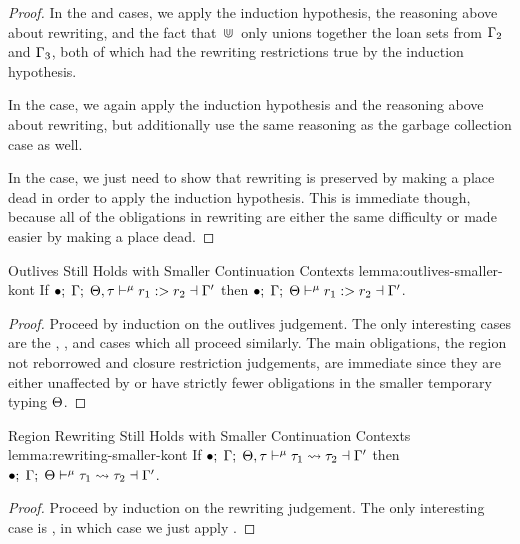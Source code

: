 \begin{proof}
  In the  and  cases, we apply the induction
  hypothesis, the reasoning above about rewriting, and the fact that
  $\, \Cup \,$ only unions together the loan sets from $\Gamma_2$ and
  $\Gamma_3$, both of which had the rewriting restrictions true by the
  induction hypothesis.

  In the  case, we again apply the induction hypothesis and the
  reasoning above about rewriting, but additionally use the same reasoning as
  the garbage collection case as well.

  In the  case, we just need to show that rewriting is preserved
  by making a place dead in order to apply the induction hypothesis. This is
  immediate though, because all of the obligations in rewriting are either the
  same difficulty or made easier by making a place dead.
\end{proof}

\begin{oxlemma}{Outlives Still Holds with Smaller Continuation Contexts}
  {lemma:outlives-smaller-kont}
  If $\bullet; \; \Gamma; \; \Theta, \tau \vdash^{\mu} r_1 :> r_2 \dashv \Gamma^\prime$
  then $\bullet; \; \Gamma; \; \Theta \vdash^{\mu} r_1 :> r_2 \dashv \Gamma^\prime$.
\end{oxlemma}
\begin{proof}
  Proceed by induction on the outlives judgement. The only interesting cases are
  the , , and
   cases which all proceed similarly. The main
  obligations, the region not reborrowed and closure restriction judgements, are
  immediate since they are either unaffected by or have strictly fewer
  obligations in the smaller temporary typing $\Theta$.
\end{proof}

\begin{oxlemma}{Region Rewriting Still Holds with Smaller Continuation Contexts}
  {lemma:rewriting-smaller-kont}
  If $\bullet; \; \Gamma; \; \Theta, \tau \vdash^{\mu} \tau_1 \leadsto \tau_2 \dashv \Gamma^\prime$
  then $\bullet; \; \Gamma; \; \Theta \vdash^{\mu} \tau_1 \leadsto \tau_2 \dashv \Gamma^\prime$.
\end{oxlemma}
\begin{proof}
  Proceed by induction on the rewriting judgement. The only interesting case is
  , in which case we just apply
  .
\end{proof}

